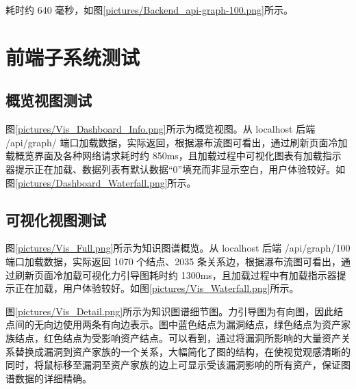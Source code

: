 \documentclass[a4paper,AutoFakeBold,oneside,12pt]{book}
\begin{document}

耗时约 640 毫秒，如图\ref{pictures/Backend_api-graph-100.png}所示。


\section{前端子系统测试}

\subsection{概览视图测试\label{概览视图测试}}

图\ref{pictures/Vis_Dashboard_Info.png}所示为概览视图。从 localhost 后端 /api/graph/ 端口加载数据，实际返回，根据瀑布流图可看出，通过刷新页面冷加载概览界面及各种网络请求耗时约 850ms，且加载过程中可视化图表有加载指示器提示正在加载、数据列表有默认数据“0”填充而非显示空白，用户体验较好。如图\ref{pictures/Dashboard_Waterfall.png}所示。



\subsection{可视化视图测试\label{可视化视图测试}}

图\ref{pictures/Vis_Full.png}所示为知识图谱概览。从 localhost 后端 /api/graph/100 端口加载数据，实际返回 1070 个结点、2035 条关系边，根据瀑布流图可看出，通过刷新页面冷加载可视化力引导图耗时约 1300ms，且加载过程中有加载指示器提示正在加载，用户体验较好。如图\ref{pictures/Vis_Waterfall.png}所示。



图\ref{pictures/Vis_Detail.png}所示为知识图谱细节图。力引导图为有向图，因此结点间的无向边使用两条有向边表示。图中蓝色结点为漏洞结点，绿色结点为资产家族结点，红色结点为受影响资产结点。可以看到，通过将漏洞所影响的大量资产关系替换成漏洞到资产家族的一个关系，大幅简化了图的结构，在使视觉观感清晰的同时，将鼠标移至漏洞至资产家族的边上可显示受该漏洞影响的所有资产，保证图谱数据的详细精确。
\end{document}
